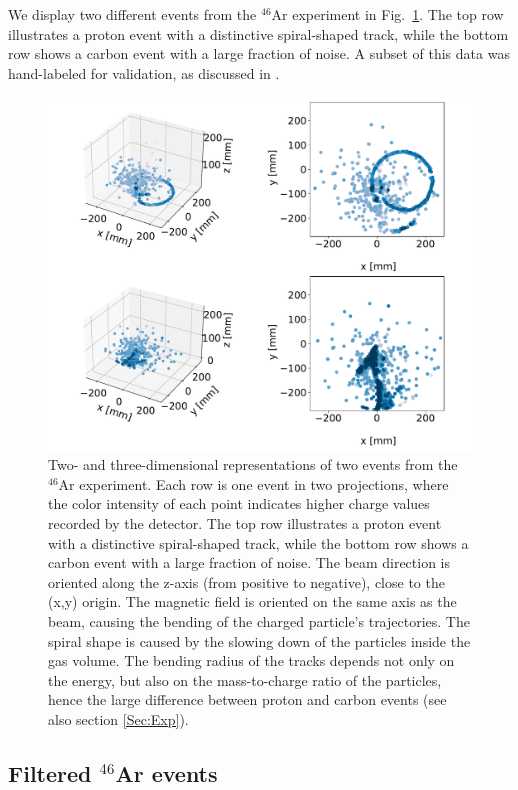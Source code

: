 \documentclass[preprint,12pt]{elsarticle}
\begin{document}
We display two different events from the ${}^{46}$Ar experiment in Fig.~\ref{fig:samples}. The top row illustrates a proton event with a distinctive spiral-shaped track, while the bottom row shows a carbon event with a large fraction of noise. 
A subset of this data was hand-labeled for validation, as discussed in \cite{Kuchera2019}.
\begin{figure}[ht]
\centering
\includegraphics[width=\textwidth]{custom_work/examples_raw.pdf}
\caption[Displaying unfiltered events in two and three dimensions]{Two- and three-dimensional representations of two events from the ${}^{46}$Ar experiment. Each row is one event in two projections, where the color intensity of each point indicates higher charge values recorded by the detector. The top row illustrates a proton event with a distinctive spiral-shaped track, while the bottom row shows a carbon event with a large fraction of noise. The beam direction is oriented along the z-axis (from positive to negative), close to the (x,y) origin. The magnetic field is oriented on the same axis as the beam, causing the bending of the charged particle's trajectories. The spiral shape is caused by the slowing down of the particles inside the gas volume. The bending radius of the tracks depends not only on the energy, but also on the mass-to-charge ratio of the particles, hence the large difference between proton and carbon events (see also section \ref{Sec:Exp}).}
\label{fig:samples}
\end{figure}

\subsection{Filtered \texorpdfstring{${}^{46}$Ar}{46Ar} events}\label{sec:filtered}
\end{document}
